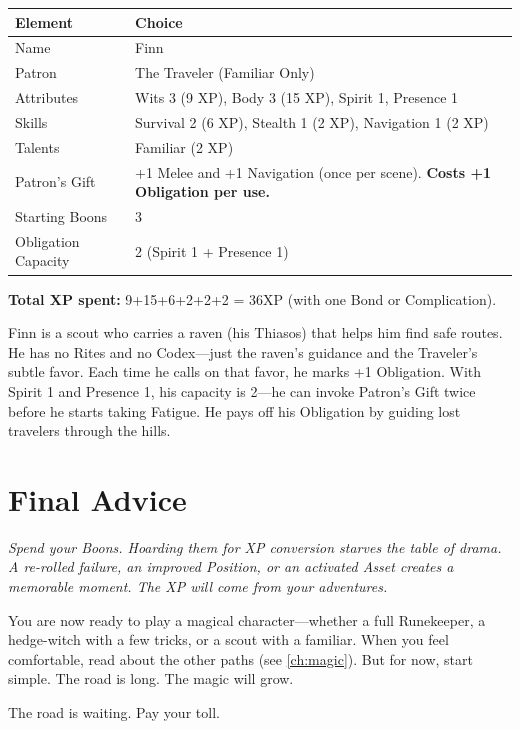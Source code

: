 \begin{center}
\small
\renewcommand{\arraystretch}{1.1}
\begin{tabular}{ll}
\toprule
\textbf{Element} & \textbf{Choice} \\
\midrule
Name & Finn \\
Patron & The Traveler (Familiar Only) \\
Attributes & Wits 3 (9 XP), Body 3 (15 XP), Spirit 1, Presence 1 \\
Skills & Survival 2 (6 XP), Stealth 1 (2 XP), Navigation 1 (2 XP) \\
Talents & Familiar (2 XP) \\
Patron's Gift & +1 Melee and +1 Navigation (once per scene). \textbf{Costs +1 Obligation per use.} \\
Starting Boons & 3 \\
Obligation Capacity & 2 (Spirit 1 + Presence 1) \\
\bottomrule
\end{tabular}
\end{center}

\textbf{Total XP spent:} 9+15+6+2+2+2 = 36XP (with one Bond or Complication).

\medskip
\noindent Finn is a scout who carries a raven (his Thiasos) that helps him find safe routes. He has no Rites and no Codex---just the raven's guidance and the Traveler's subtle favor. Each time he calls on that favor, he marks +1 Obligation. With Spirit 1 and Presence 1, his capacity is 2---he can invoke Patron's Gift twice before he starts taking Fatigue. He pays off his Obligation by guiding lost travelers through the hills.

\section{Final Advice}
\label{sec:final-advice-magic}

\begin{tcolorbox}[
  colback=green!5!white,
  colframe=green!75!black,
  title=The One Rule for New Magical Players,
  fonttitle=\bfseries,
  breakable
]
\emph{Spend your Boons. Hoarding them for XP conversion starves the table of drama. A re-rolled failure, an improved Position, or an activated Asset creates a memorable moment. The XP will come from your adventures.}
\end{tcolorbox}

You are now ready to play a magical character---whether a full Runekeeper, a hedge-witch with a few tricks, or a scout with a familiar. When you feel comfortable, read about the other paths (see \ref{ch:magic}). But for now, start simple. The road is long. The magic will grow.

The road is waiting. Pay your toll.